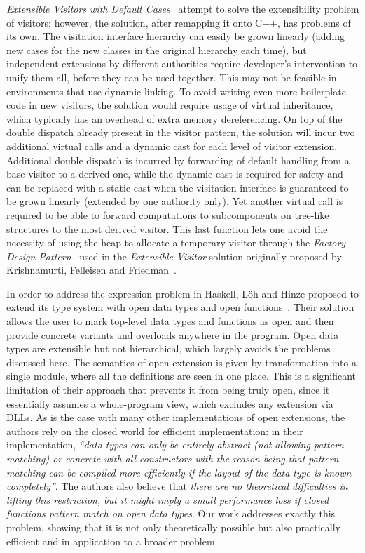 \emph{Extensible Visitors with Default Cases}~\cite[]{Zenger:2001} attempt to solve the extensibility problem of visitors; 
however, the solution, after 
remapping it onto C++, has problems of its own. The visitation interface 
hierarchy can easily be grown linearly (adding new cases for the new classes in 
the original hierarchy each time), but independent extensions by different  
authorities require developer's intervention to unify them all, before they can 
be used together. This may not be feasible in environments that use dynamic 
linking. To avoid writing even more boilerplate code in new visitors, the 
solution would require usage of virtual inheritance, which typically has 
an overhead of extra memory dereferencing. On top of the double dispatch already 
present in the visitor pattern, the solution will incur two additional virtual 
calls and a dynamic cast for each level of visitor extension. Additional double 
dispatch is incurred by forwarding of default handling from a base visitor to a 
derived one, while the dynamic cast is required for safety and can be replaced 
with a static cast when the visitation interface is guaranteed to be grown linearly 
(extended by one authority only). Yet another virtual call is required to be 
able to forward computations to subcomponents on tree-like structures to the 
most derived visitor. This last function lets one avoid the necessity of using 
the heap to allocate a temporary visitor through the \emph{Factory Design 
Pattern}~\cite{DesignPatterns1993} used in the \emph{Extensible Visitor} solution 
originally proposed by Krishnamurti, Felleisen and Friedman~\cite{Krishnamurthi98}.

In order to address the expression problem in Haskell, L\"{o}h and Hinze proposed to 
extend its type system with open data types and open functions~\cite{LohHinze2006}.
Their solution allows the user to mark top-level data types and functions as 
open and then provide concrete variants and overloads anywhere in the program. 
Open data types are extensible but not hierarchical, which largely avoids the 
problems discussed here. The semantics of open extension is given by 
transformation into a single module, where all the definitions are seen in one 
place. This is a significant limitation of their approach that prevents it from 
being truly open, since it essentially assumes a whole-program view, which 
excludes any extension via DLLs. As is the case with many other implementations 
of open extensions, the authors rely on the closed world for efficient 
implementation: in their implementation, \emph{``data types can only be entirely 
abstract (not allowing pattern matching) or concrete with all constructors with 
the reason being that pattern matching can be compiled more efficiently if the 
layout of the data type is known completely''}. The authors also believe that 
\emph{there are no theoretical difficulties in lifting this restriction, but it 
might imply a small performance loss if closed functions pattern match on open 
data types}. Our work addresses exactly this problem, showing that it is not 
only theoretically possible but also practically efficient and in application to 
a broader problem.

